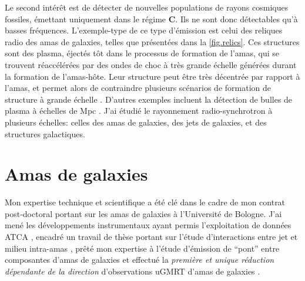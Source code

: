 \pg
Le second int\'er\^et est de d\'etecter de nouvelles populations de rayons cosmiques fossiles, \'emettant uniquement dans le r\'egime \textbf{C}. Ils ne sont donc d\'etectables qu'\`a basses fr\'equences. %
L'exemple-type de ce type d'\'emission est celui des reliques radio des amas de galaxies, telles que pr\'esent\'ees dans la \cref{fig.relics}. Ces structures sont des plasma, \'eject\'es t\^ot dans le processus de formation de l'amas, qui se trouvent r\'eacc\'el\'er\'ees par des ondes de choc \`a tr\`es grande \'echelle g\'en\'er\'ees durant la formation de l'amas-h\^ote. Leur structure peut \^etre tr\`es d\'ecentr\'ee par rapport \`a l'amas, et permet alors de contraindre plusieurs sc\'enarios de formation de structure \`a grande \'echelle \cite[e.g.][]{2020AA...642L..13R}. D'autres exemples incluent la d\'etection de bulles de plasma \`a \'echelles de Mpc \cite{2021NatAs...5.1261B}. J'ai \'etudi\'e le rayonnement radio-synchrotron \`a plusieurs \'echelles: celles des amas de galaxies, des jets de galaxies, et des structures galactiques.


%
%





\newpage
\section{Amas de galaxies}\label{pastwork.nenufar}

\pg
Mon expertise technique et scientifique a \'et\'e cl\'e dans le cadre de mon contrat post-doctoral portant sur les amas de galaxies \`a l'Universit\'e de Bologne. J'ai men\'e les d\'eveloppements instrumentaux ayant permis l'exploitation de donn\'ees ATCA \cite{2022MNRAS.515.1871R}, encadr\'e un travail de th\`ese portant sur l'\'etude d'interactions entre jet et milieu intra-amas \cite{2021A&A...650A.170B}, pr\^et\'e mon expertise \`a l'\'etude d'\'emission de ``pont'' entre composantes d'amas de galaxies \cite{2021ApJ...907...32B} et effectu\'e la \textit{premi\`ere et unique r\'eduction d\'ependante de la direction} d'observations uGMRT d'amas de galaxies \cite{2020A&A...636A..30R}. %


